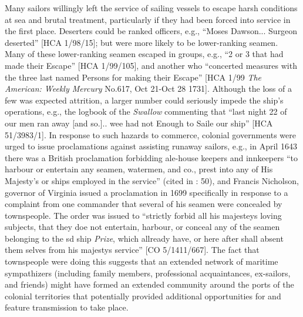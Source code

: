 Many sailors willingly left the service of sailing vessels to escape harsh conditions at sea and brutal treatment, particularly if they had been forced into service in the first place. Deserters could be ranked officers, e.g., “Moses Dawson... Surgeon deserted” [HCA 1/98/15]; but were more likely to be lower-ranking seamen. Many of these lower-ranking seamen escaped in groups, e.g., “2 or 3 that had made their Escape” [HCA 1/99/105], and another  who “concerted measures with the three last named Persons for making their Escape” [HCA 1/99 \textit{The American: Weekly Mercury} No.617, Oct 21-Oct 28 1731]. Although the loss of a few  was expected attrition, a larger number could seriously impede the ship’s operations, e.g., the logbook of the \textit{Swallow} commenting that “last night 22 of our men ran away [and so.]..  wee had not Enough to Saile our ship” [HCA 51/3983/1]. In response to such hazards to commerce, colonial governments were urged to issue proclamations against  assisting runaway sailors, e.g., in April {1643} there was a British proclamation forbidding ale-house keepers and innkeepers “to harbour or entertain any seamen, watermen, and co., prest into any of His Majesty’s or  ships employed in the service” (cited in \citealt{Lavery2009}: 50), and Francis Nicholson, governor of Virginia issued a proclamation in 1699 specifically in response to a complaint from one commander that several of his seamen were concealed by townspeople. The order was issued to “strictly forbid all his majesteys loving subjects, that they doe not entertain, harbour, or conceal any of the seamen belonging to the sd ship \textit{ Prize}, which allready have, or here after shall absent them selves from his majestys service” [CO 5/1411/667]. The fact that townspeople were doing this suggests that an extended network of maritime sympathizers (including family members, professional acquaintances, ex-sailors, and friends) might have formed an extended community around the ports of the colonial territories that potentially provided additional opportunities for  and feature transmission to take place. 

